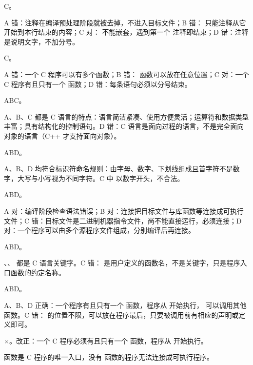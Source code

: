 \documentclass[a4paper,11pt]{article}
\begin{document}
\q C。\begin{analysis}A 错：注释在编译预处理阶段就被去掉，不进入目标文件；B 错：\code{//} 只能注释从它开始到本行结束的内容；C 对： 不能嵌套，遇到第一个 \code{*/} 注释即结束；D 错：注释是说明文字，不加分号。\end{analysis}

\q C。\begin{analysis}A 错：一个 C 程序可以有多个函数；B 错： 函数可以放在任意位置；C 对：一个 C 程序有且只有一个  函数；D 错：每条语句必须以分号结束。\end{analysis}


\q ABC。\begin{analysis}A、B、C 都是 C 语言的特点：语言简洁紧凑、使用方便灵活；运算符和数据类型丰富；具有结构化的控制语句。D 错：C 语言是面向过程的语言，不是完全面向对象的语言（C++ 才支持面向对象）。\end{analysis}

\q ABD。\begin{analysis}A、B、D 均符合标识符命名规则：由字母、数字、下划线组成且首字符不是数字，大写与小写视为不同字符。C 中  以数字开头，不合法。\end{analysis}

\q ABD。\begin{analysis}A 对：编译阶段检查语法错误；B 对：连接把目标文件与库函数等连接成可执行文件；C 错：目标文件是二进制机器指令文件，尚不能直接运行，必须连接；D 对：一个程序可以由多个源程序文件组成，分别编译后再连接。\end{analysis}

\q ABD。\begin{analysis}、、 都是 C 语言关键字。C 错： 是用户定义的函数名，不是关键字，只是程序入口函数的约定名称。\end{analysis}

\q ABD。\begin{analysis}A、B、D 正确：一个程序有且只有一个  函数，程序从  开始执行， 可以调用其他函数。C 错： 的位置不限，可以放在程序最后，只要被调用前有相应的声明或定义即可。\end{analysis}


\q ×。改正：一个 C 程序必须有且只有一个  函数，程序从  开始执行。\begin{analysis} 函数是 C 程序的唯一入口，没有  函数的程序无法连接成可执行程序。\end{analysis}
\end{document}
